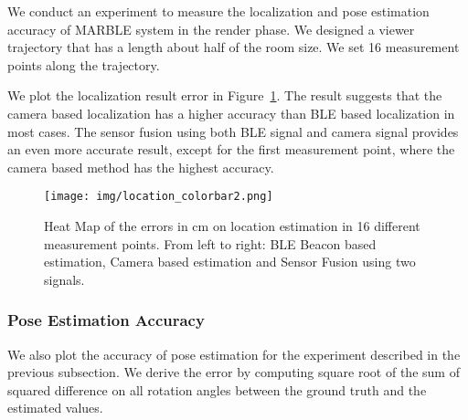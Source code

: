 We conduct an experiment to measure the localization and pose estimation accuracy of MARBLE system in the render phase. We designed a viewer trajectory that has a length about half of the room size. We set 16 measurement points along the trajectory. 

We plot the localization result error in Figure~\ref{fig:location_heatmap}. The result suggests that the camera based localization has a higher accuracy than BLE based localization in most cases. The sensor fusion using both BLE signal and camera signal provides an even more accurate result, except for the first measurement point, where the camera based method has the highest accuracy.

\begin{figure}[!htb]
	\begin{center}
		\texttt{[image: img/location\_colorbar2.png]}
		\caption{Heat Map of the errors in cm on location estimation in 16 different measurement points. From left to right: BLE Beacon based estimation, Camera based estimation and Sensor Fusion using two signals.}
		\label{fig:location_heatmap}
	\end{center}
	\vspace{-1.5em}
\end{figure}

\subsubsection{Pose Estimation Accuracy}
We also plot the accuracy of pose estimation for the experiment described in the previous subsection. We derive the error by computing square root of the sum of squared difference on all rotation angles between the ground truth and the estimated values.

